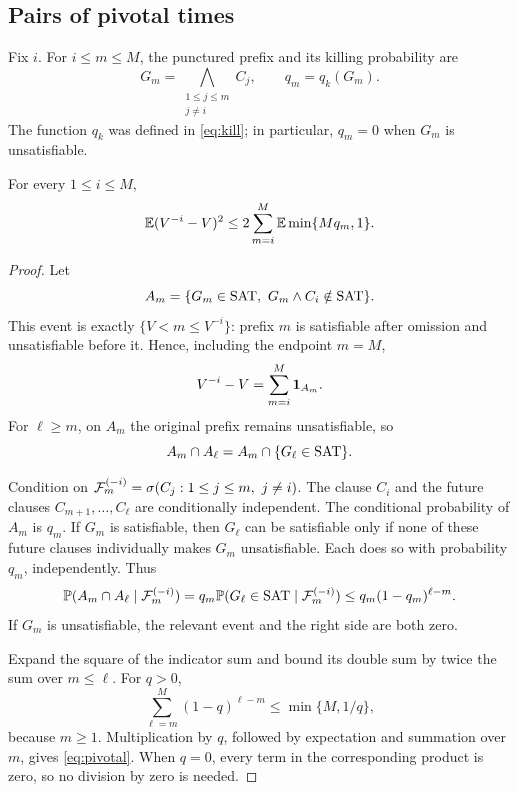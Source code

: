 \subsection{Pairs of pivotal times}

Fix \(i\). For \(i\le m\le M\), the punctured prefix and its killing
probability are
\[
 G_m=\bigwedge_{\substack{1\le j\le m\\j\ne i}}C_j,\qquad
 q_m=q_k(G_m).
\]
The function \(q_k\) was defined in \eqref{eq:kill}; in particular,
\(q_m=0\) when \(G_m\) is unsatisfiable.

\begin{lemma}\label{lem:pivotal}
For every \(1\le i\le M\),
\begin{equation}\label{eq:pivotal}
 \mathbb E(V^{-i}-V)^2
 \le2\sum_{m=i}^{M}\mathbb E\min\{Mq_m,1\}.
\end{equation}
\end{lemma}

\begin{proof}
Let
\[
 A_m=\{G_m\in\sat,\ G_m\wedge C_i\notin\sat\}.
\]
This event is exactly \(\{V<m\le V^{-i}\}\): prefix \(m\) is
satisfiable after omission and unsatisfiable before it. Hence, including
the endpoint \(m=M\),
\[
 V^{-i}-V=\sum_{m=i}^{M}\mathbf 1_{A_m}.
\]
For \(\ell\ge m\), on \(A_m\) the original prefix remains
unsatisfiable, so
\[
 A_m\cap A_\ell=A_m\cap\{G_\ell\in\mathrm{SAT}\}.
\]

Condition on
\(\mathcal F_m^{(-i)}=\sigma(C_j:1\le j\le m,\ j\ne i)\).
The clause \(C_i\) and the future clauses
\(C_{m+1},\ldots,C_\ell\) are conditionally independent. The
conditional probability of \(A_m\) is \(q_m\). If \(G_m\) is
satisfiable, then \(G_\ell\) can be satisfiable only if none of these
future clauses individually makes \(G_m\) unsatisfiable. Each does so
with probability \(q_m\), independently. Thus
\begin{equation}\label{eq:pivotal-pair}
 \mathbb P(A_m\cap A_\ell\mid\mathcal F_m^{(-i)})
 =q_m\mathbb P(G_\ell\in\mathrm{SAT}\mid\mathcal F_m^{(-i)})
 \le q_m(1-q_m)^{\ell-m}.
\end{equation}
If \(G_m\) is unsatisfiable, the relevant event and the right side are
both zero.

Expand the square of the indicator sum and bound its double sum by
twice the sum over \(m\le\ell\). For \(q>0\),
\[
 \sum_{\ell=m}^{M}(1-q)^{\ell-m}\le\min\{M,1/q\},
\]
because \(m\ge1\). Multiplication by \(q\), followed by expectation
and summation over \(m\), gives \eqref{eq:pivotal}. When \(q=0\), every
term in the corresponding product is zero, so no division by zero is
needed.
\end{proof}


